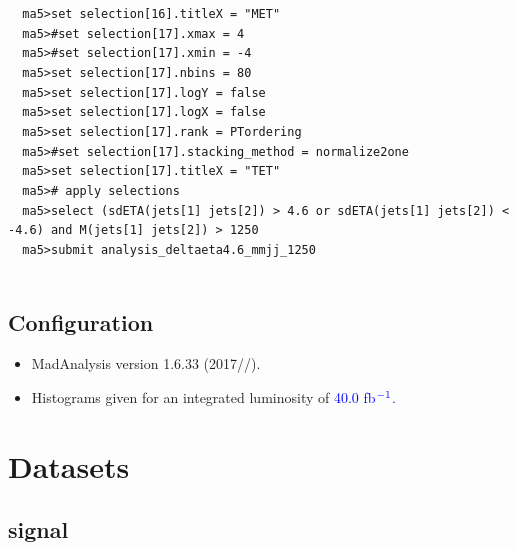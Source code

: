 \documentclass[a4paper, 10pt]{article}
\begin{document}
\texttt{ }\texttt{ }\texttt{ma5>set selection[16].titleX = "MET"\\
}
\texttt{ }\texttt{ }\texttt{ma5>\#set selection[17].xmax = 4\\
}
\texttt{ }\texttt{ }\texttt{ma5>\#set selection[17].xmin = -4\\
}
\texttt{ }\texttt{ }\texttt{ma5>set selection[17].nbins = 80\\
}
\texttt{ }\texttt{ }\texttt{ma5>set selection[17].logY = false\\
}
\texttt{ }\texttt{ }\texttt{ma5>set selection[17].logX = false\\
}
\texttt{ }\texttt{ }\texttt{ma5>set selection[17].rank = PTordering\\
}
\texttt{ }\texttt{ }\texttt{ma5>\#set selection[17].stacking\_method = normalize2one\\
}
\texttt{ }\texttt{ }\texttt{ma5>set selection[17].titleX = "TET"\\
}
\texttt{ }\texttt{ }\texttt{ma5>\# apply selections\\
}
\texttt{ }\texttt{ }\texttt{ma5>select (sdETA(jets[1] jets[2]) > 4.6 or sdETA(jets[1] jets[2]) < -4.6) and M(jets[1] jets[2]) > 1250\\
}
\texttt{ }\texttt{ }\texttt{ma5>submit analysis\_deltaeta4.6\_mmjj\_1250\\
}
\texttt{ }\texttt{ }\subsection{ Configuration}

\begin{itemize}
  \item MadAnalysis version 1.6.33 (2017//).
   \item Histograms given for an integrated luminosity of \textcolor{blue}{40.0}\textcolor{blue}{ fb}$^{\textcolor{blue}{-1}}$\textcolor{blue}{.}
\textcolor{blue}{}
\end{itemize}
\newpage
\section{ Datasets}

\subsection{ signal}
\end{document}
